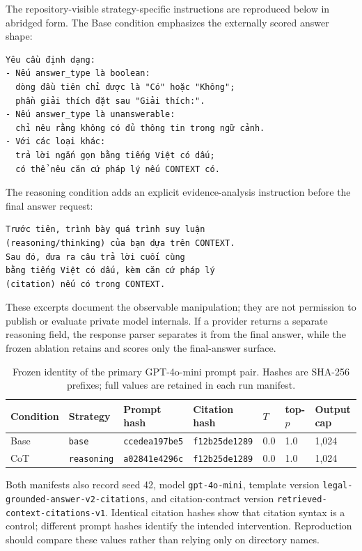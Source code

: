 The repository-visible strategy-specific instructions are reproduced below in
abridged form. The Base condition emphasizes the externally scored answer
shape:

{\scriptsize
\begin{verbatim}
Yêu cầu định dạng:
- Nếu answer_type là boolean:
  dòng đầu tiên chỉ được là "Có" hoặc "Không";
  phần giải thích đặt sau "Giải thích:".
- Nếu answer_type là unanswerable:
  chỉ nêu rằng không có đủ thông tin trong ngữ cảnh.
- Với các loại khác:
  trả lời ngắn gọn bằng tiếng Việt có dấu;
  có thể nêu căn cứ pháp lý nếu CONTEXT có.
\end{verbatim}
}

The reasoning condition adds an explicit evidence-analysis instruction before
the final answer request:

{\scriptsize
\begin{verbatim}
Trước tiên, trình bày quá trình suy luận
(reasoning/thinking) của bạn dựa trên CONTEXT.
Sau đó, đưa ra câu trả lời cuối cùng
bằng tiếng Việt có dấu, kèm căn cứ pháp lý
(citation) nếu có trong CONTEXT.
\end{verbatim}
}

These excerpts document the observable manipulation; they are not permission
to publish or evaluate private model internals. If a provider returns a
separate reasoning field, the response parser separates it from the final
answer, while the frozen ablation retains and scores only the final-answer
surface.

\begin{table}[t]
\centering
\scriptsize
\caption{Frozen identity of the primary GPT-4o-mini prompt pair. Hashes are SHA-256 prefixes; full values are retained in each run manifest.}
\label{tab:appendix-prompt-identity}
\begin{tabular}{lllllll}
\toprule
\textbf{Condition} & \textbf{Strategy} & \textbf{Prompt hash} & \textbf{Citation hash} & \textbf{$T$} & \textbf{top-$p$} & \textbf{Output cap} \\
\midrule
Base & \texttt{base} & \texttt{ccedea197be5} & \texttt{f12b25de1289} & 0.0 & 1.0 & 1,024 \\
CoT & \texttt{reasoning} & \texttt{a02841e4296c} & \texttt{f12b25de1289} & 0.0 & 1.0 & 1,024 \\
\bottomrule
\end{tabular}
\end{table}

Both manifests also record seed 42, model \texttt{gpt-4o-mini}, template
version \texttt{legal-grounded-answer-v2-citations}, and citation-contract
version \texttt{retrieved-context-citations-v1}. Identical citation hashes
show that citation syntax is a control; different prompt hashes identify the
intended intervention. Reproduction should compare these values rather than
relying only on directory names.

